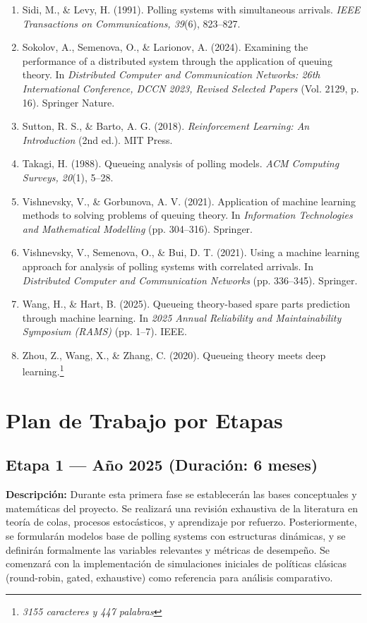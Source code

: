 \documentclass[12pt]{article}
\begin{document}
\begin{enumerate}
  \item Sidi, M., \& Levy, H. (1991). Polling systems with simultaneous arrivals. \textit{IEEE Transactions on Communications, 39}(6), 823–827.
  \item Sokolov, A., Semenova, O., \& Larionov, A. (2024). Examining the performance of a distributed system through the application of queuing theory. In \textit{Distributed Computer and Communication Networks: 26th International Conference, DCCN 2023, Revised Selected Papers} (Vol. 2129, p. 16). Springer Nature.
  \item Sutton, R. S., \& Barto, A. G. (2018). \textit{Reinforcement Learning: An Introduction} (2nd ed.). MIT Press.
  \item Takagi, H. (1988). Queueing analysis of polling models. \textit{ACM Computing Surveys, 20}(1), 5–28.
  \item Vishnevsky, V., \& Gorbunova, A. V. (2021). Application of machine learning methods to solving problems of queuing theory. In \textit{Information Technologies and Mathematical Modelling} (pp. 304–316). Springer.
  \item Vishnevsky, V., Semenova, O., \& Bui, D. T. (2021). Using a machine learning approach for analysis of polling systems with correlated arrivals. In \textit{Distributed Computer and Communication Networks} (pp. 336–345). Springer.
  \item Wang, H., \& Hart, B. (2025). Queueing theory-based spare parts prediction through machine learning. In \textit{2025 Annual Reliability and Maintainability Symposium (RAMS)} (pp. 1–7). IEEE.
  \item Zhou, Z., Wang, X., \& Zhang, C. (2020). Queueing theory meets deep learning.\footnote{\textit{3155 caracteres y 447 palabras}}
\end{enumerate}




\section{Plan de Trabajo por Etapas}

\subsection*{Etapa 1 — Año 2025 (Duración: 6 meses)}
\textbf{Descripción:} Durante esta primera fase se establecerán las bases conceptuales y matemáticas del proyecto. Se realizará una revisión exhaustiva de la literatura en teoría de colas, procesos estocásticos, y aprendizaje por refuerzo. Posteriormente, se formularán modelos base de polling systems con estructuras dinámicas, y se definirán formalmente las variables relevantes y métricas de desempeño. Se comenzará con la implementación de simulaciones iniciales de políticas clásicas (round-robin, gated, exhaustive) como referencia para análisis comparativo.
\end{document}
